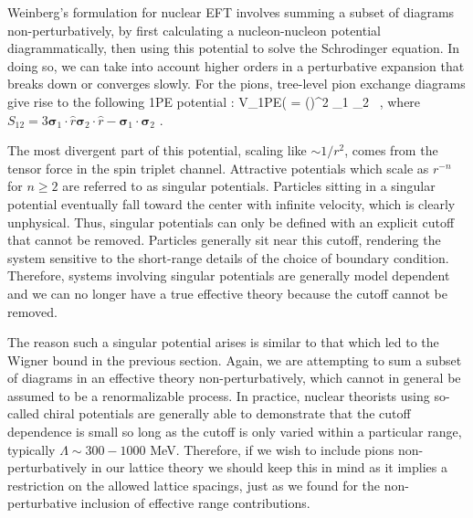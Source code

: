 Weinberg's formulation for nuclear EFT involves summing a subset of diagrams non-perturbatively, by first calculating a nucleon-nucleon potential diagrammatically, then using this potential to solve the Schrodinger equation. In doing so, we can take into account higher orders in a perturbative expansion that  breaks down or converges slowly. For the pions, tree-level pion exchange diagrams give rise to the following 1PE potential \cite{Epelbaum:2010nr}:
\beq
V_{\mbox{\tiny 1PE}}( = \left(\right)^2 \mathbf{\tau}_1 \cdot \mathbf{\tau}_2  \ , \cr
\eeq
where $S_{12} = 3\mathbf{\sigma}_1 \cdot \hat{r} \mathbf{\sigma}_2 \cdot \hat{r} - \mathbf{\sigma}_1 \cdot \mathbf{\sigma}_2$ . 

The most divergent part of this potential, scaling like $\sim 1/r^2$, comes from the tensor force in the spin triplet channel. Attractive potentials which scale as $r^{-n}$ for $n \geq 2$ are referred to as singular potentials. Particles sitting in a singular potential eventually fall toward the center with infinite velocity, which is clearly unphysical. Thus, singular potentials can only be defined with an explicit cutoff that cannot be removed. Particles generally sit near this cutoff, rendering the system sensitive to the short-range details of the choice of boundary condition. Therefore, systems involving singular potentials are generally model dependent and we can no longer have a true effective theory because the cutoff cannot be removed. 

The reason such a singular potential arises is similar to that which led to the Wigner bound in the previous section. Again, we are attempting to sum a subset of diagrams in an effective theory non-perturbatively, which cannot in general be assumed to be a renormalizable process. In practice, nuclear theorists using so-called chiral potentials are generally able to demonstrate that the cutoff dependence is small so long as the cutoff is only varied within a particular range, typically $\Lambda \sim 300-1000$ MeV. Therefore, if we wish to include pions non-perturbatively in our lattice theory we should keep this in mind as it implies a restriction on the allowed lattice spacings, just as we found for the non-perturbative inclusion of effective range contributions. 

